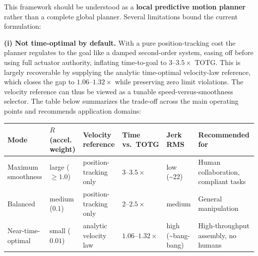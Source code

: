 This framework should be understood as a \textbf{local predictive motion
planner} rather than a complete global planner. Several limitations
bound the current formulation:

\textbf{(i) Not time-optimal by default.} With a pure position-tracking
cost the planner regulates to the goal like a damped second-order
system, easing off before using full actuator authority, inflating
time-to-goal to \(3\)--\(3.5\times\) TOTG. This is largely recoverable
by supplying the analytic time-optimal velocity-law reference, which
closes the gap to \(1.06\)--\(1.32\times\) while preserving zero limit
violations. The velocity reference can thus be viewed as a tunable
speed-versus-smoothness selector. The table below summarizes the
trade-off across the main operating points and recommends application
domains:

{\def\LTcaptype{none} %
\begin{longtable}[]{@{}
  >{\raggedright\arraybackslash}p{}
  >{\raggedright\arraybackslash}p{}
  >{\raggedright\arraybackslash}p{}
  >{\raggedright\arraybackslash}p{}
  >{\raggedright\arraybackslash}p{}
  >{\raggedright\arraybackslash}p{}@{}}
\toprule\noalign{}
\begin{minipage}[b]{\linewidth}\raggedright
Mode
\end{minipage} & \begin{minipage}[b]{\linewidth}\raggedright
\(R\) (accel. weight)
\end{minipage} & \begin{minipage}[b]{\linewidth}\raggedright
Velocity reference
\end{minipage} & \begin{minipage}[b]{\linewidth}\raggedright
Time vs.~TOTG
\end{minipage} & \begin{minipage}[b]{\linewidth}\raggedright
Jerk RMS
\end{minipage} & \begin{minipage}[b]{\linewidth}\raggedright
Recommended for
\end{minipage} \\
\midrule\noalign{}
\endhead
\bottomrule\noalign{}
\endlastfoot
Maximum smoothness & large (\(\geq 1.0\)) & position-tracking only &
\(3\)--\(3.5\times\) & low (\textasciitilde22) & Human collaboration,
compliant tasks \\
Balanced & medium (\(0.1\)) & position-tracking only &
\(2\)--\(2.5\times\) & medium & General manipulation \\
Near-time-optimal & small (\(0.01\)) & analytic velocity law &
\(1.06\)--\(1.32\times\) & high (\textasciitilde bang-bang) &
High-throughput assembly, no humans \\
\end{longtable}
}

